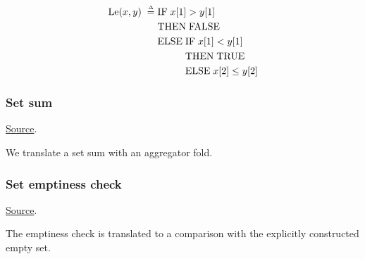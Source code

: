 \begin{align*}
\Le(x,y) \defeq&\IF\; x[1] > y[1]\\
  &\THEN\;\FALSE\\
  &\ELSE\;\IF\; x[1] < y[1]\\
       &\phantom{\ELSE\;}\THEN\; \TRUE\\
       &\phantom{\ELSE\;}\ELSE\; x[2] \le y[2]\\
\end{align*}

\subsubsection{ Set sum}
\href{https://github.com/saltiniroberto/ssf/blob/7ea6e18093d9da3154b4e396dd435549f687e6b9/high_level/common/pythonic_code_generic.py#L79-L80}{Source}.



\begin{mathpar}
\end{mathpar}
We translate a set sum with an aggregator fold.

\subsubsection{ Set emptiness check}
\href{https://github.com/saltiniroberto/ssf/blob/7ea6e18093d9da3154b4e396dd435549f687e6b9/high_level/common/pythonic_code_generic.py#L83-L84}{Source}.



\begin{mathpar}
\end{mathpar}
The emptiness check is translated to a comparison with the explicitly constructed empty set.

